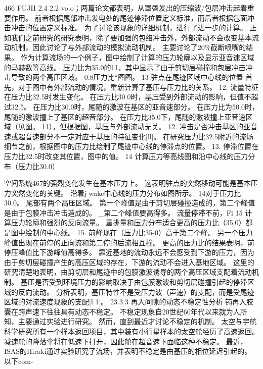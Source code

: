 \documentclass[UTF8,11pt,a4paper,openany,fontset=fandol]{ctexbook}
\begin{document}
466 FUJII 2.4 2.2 vo.o；两篇论文都表明，从罩唇发出的压缩波/包层冲击起着重要作用。 前者根据尾部冲击发电处的尾迹停滞位置定义标准，而后者根据包面冲击冲击的位置定义标准。 为了讨论该现象的详细机制，进行了进一步的计算。 正如我们之前研究的研究表明，除了要加强的包络冲击外，外部流动不会改变基本流动机制，因此讨论了与外部流动的模拟流动机制。 主要讨论了20\%截断喷嘴的结果。 作为计算流场的一个例子，图中绘制了计算的压力轮廓以及显示亚音速区域的马赫数等高线。 压力比为35.0的11，其中显示了由于剪切层碰撞和包层冲击冲击导致的两个高压区域。 0.8压力比“图图。 13 驻点在尾迹区域中心线的位置 首先，对于图中有外部流动的情况，重新计算了基压与压力比的关系。 12. 流量特征在压力比32.5时发生变化。 在压力比30.0时，基压受到外部流动的影响，但值不超过32.5。 在压力比30.0时，尾随的激波在基区的亚音速部分。 在压力比为50.0时，尾随的激波撞上了基区的超音部分。 在压力比35.0下，尾随的激波撞上亚音速区域（见图。 11），但根据图，基压与外部流动无关。 12. 冲击是否冲击基区的亚音速或超音速部分不一定对应于基压的特征变化[ll]。 在研究压力比32.5附近的流场细节之前，根据图中的压力比绘制了尾迹中心线的停滞点的位置。 13. 停滞位置在压力比32.5时改变其位置，图中的值。 14 计算压力等高线图和沿中心线的压力分布（压力比30.0）

空间系统467的强烈变化发生在基本压力上。 这表明驻点的突然移动可能是基本压力突然变化的关键。 沿着j wake中心线的压力分布如图所示。 14对于压力比30.0。 尾部有两个高压区域。 第一个峰值是由于剪切层碰撞造成的，第二个峰值是由于包膜冲击冲击造成的。 \_第二个峰值要高得多。 流量停滞不前，Fi 15 计算压力轮廓和强烈的反向流量。 重排量和压力分布适合更高的压力比（35.0）都是图中绘制的中心线。 15. 前峰现在（压力比35-0）高于第二个峰。 另一个压力峰值出现在前停的正向流和第二停的后流相互撞。 更高的压力比的结果表明，前停压峰值比下游峰值高得多。 靠近基地的流动永远不会感受到下游的压力，因为由于剪切层碰撞产生的高压区域的存在，下游的流动不会进入基地区域。 这里的研究清楚地表明，由剪切层和尾迹中的包膜激波诱导的两个高压区域支配着流动机制。 基压是否受到环境压力的影响取决于由包膜激波和剪切层碰撞引起的停滞区域的反向流动。 分析表明，基压特性不是受压力波（声速）的支配，而是受尾迹区域的对流速度现象的支配[l 1]。 23.3.3 再入间隙的动态不稳定性分析 钝再入胶囊在跨声速下往往具有动态不稳定。 不稳定现象自20世纪60年代以来就为人所知，主要通过实验进行研究。 然而，直到最近才讨论不稳定的机制。 太空与宇航科学研究所有一个样本返回项目，其中装有小行星样本的太空舱经历了高速返回。 减速舱的降落伞将在低速下打开，因此舱在超音速下面临这种不稳定。 最近，ISAS的Hiraki通过实验研究了流场，并表明不稳定是由基压的相位延迟引起的。 以下com-
\end{document}
